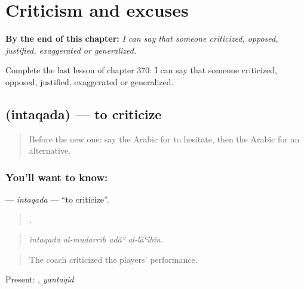 
\chapter{Criticism and excuses}
\label{ch:ar-criticism-and-excuses}

\begin{chapteropening}
\textbf{By the end of this chapter:} \emph{I can say that someone criticized, opposed, justified, exaggerated or generalized.}

Complete the last lesson of chapter 370: I can say that someone criticized, opposed, justified, exaggerated or generalized.
\end{chapteropening}

\section[\texorpdfstring{\ar{انتقد} (intaqada)}{انتقد (intaqada)}]{ (intaqada) — to criticize}

\label{lesson:AR-C370-intaqada}



\begin{quote}
Before the new one: say the Arabic for to hesitate, then the Arabic for an alternative.
\end{quote}

\subsection*{You'll want to know: }
\textbf{} — \emph{intaqada} — \textquotedblleft{}to criticize\textquotedblright{}.

\begin{quote}
   .
\end{quote}

\begin{quote}
\emph{intaqada al-mudarrib adāʾ al-lāʿibīn.}
\end{quote}

\begin{quote}
The coach criticized the players' performance.
\end{quote}

Present: , \emph{yantaqid}.

